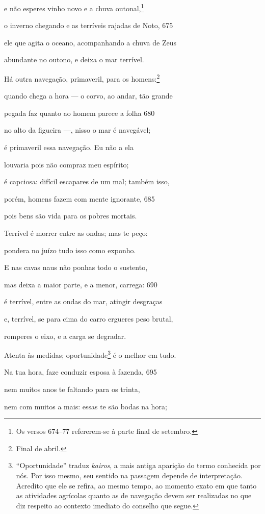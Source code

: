 e não esperes vinho novo e a chuva outonal,\footnote{Os versos 674--77 refererem-se à parte final de setembro.}

o inverno chegando e as terríveis rajadas de Noto, \num{675}

ele que agita o oceano, acompanhando a chuva de Zeus

abundante no outono, e deixa o mar terrível.

Há outra navegação, primaveril, para os homens:\footnote{Final de abril.}

quando chega a hora --- o corvo, ao andar, tão grande

pegada faz quanto ao homem parece a folha \num{680}

no alto da figueira ---, nisso o mar é navegável;

é primaveril essa navegação. Eu não a ela

louvaria pois não compraz meu espírito;

é capciosa: difícil escapares de um mal; também isso,

porém, homens fazem com mente ignorante, \num{685}

pois bens são vida para os pobres mortais.

Terrível é morrer entre as ondas; mas te peço:

pondera no juízo tudo isso como exponho.

E nas cavas naus não ponhas todo o sustento,

mas deixa a maior parte, e a menor, carrega: \num{690}

é terrível, entre as ondas do mar, atingir desgraças

e, terrível, se para cima do carro ergueres peso brutal,

romperes o eixo, e a carga se degradar.

Atenta às medidas; oportunidade\footnote{``Oportunidade'' traduz \emph{kairos}, a mais antiga aparição do
termo conhecida por nós. Por isso mesmo, seu sentido na passagem depende
de interpretação. Acredito que ele se refira, ao mesmo tempo, ao momento
exato em que tanto as atividades agrícolas quanto as de navegação devem
ser realizadas no que diz respeito ao contexto imediato do conselho que
segue.} é o melhor em tudo.

Na tua hora, faze conduzir esposa à fazenda, \num{695}

nem muitos anos te faltando para os trinta,

nem com muitos a mais: essas te são bodas na hora;

